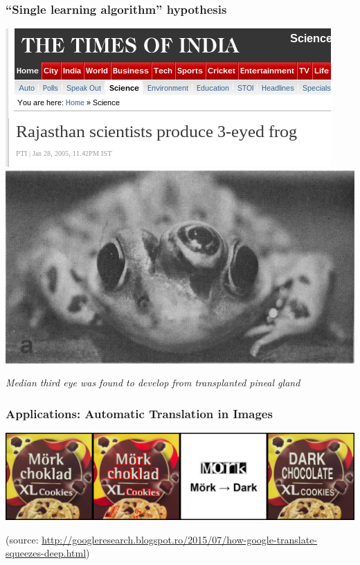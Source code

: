 \begin{frame}
  \frametitle{``Single learning algorithm'' hypothesis}
  \begin{center}
    \includegraphics[width=.5\textwidth]{graphics/third_eye_2.png}%
    \\ \vspace*{1em}
    \includegraphics[width=.45\textwidth]{graphics/third_eye.png}%
  \end{center}
  \begin{center}
    \emph{Median third eye was found to develop from transplanted pineal gland} \cite{jangir2005third}
  \end{center}
\end{frame}


\begin{frame}
  \frametitle{Applications: Automatic Translation in Images}
  \begin{center}
    \includegraphics[width=.8\textwidth]{graphics/dark_chocolate}
  \end{center}
  \begin{center}
    {\tiny (source:
      \url{http://googleresearch.blogspot.ro/2015/07/how-google-translate-squeezes-deep.html})}
  \end{center}

\end{frame}

